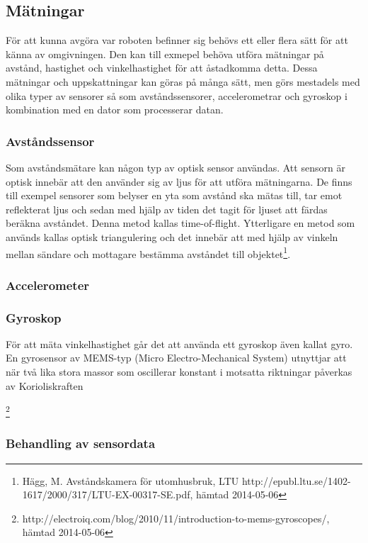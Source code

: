 \documentclass[a4paper,12pt,fleqn]{article}
\begin{document}
\subsection{Mätningar}

För att kunna avgöra var roboten befinner sig behövs ett eller flera sätt för att känna av omgivningen. Den kan till exmepel behöva utföra mätningar på avstånd, hastighet och vinkelhastighet för att åstadkomma detta. Dessa mätningar och uppskattningar kan göras på många sätt, men görs mestadels med olika typer av sensorer så som avståndssensorer, accelerometrar och gyroskop i kombination med en dator som processerar datan.

\subsubsection{Avståndssensor}

Som avståndsmätare kan någon typ av optisk sensor användas. Att sensorn är optisk innebär att den använder sig av ljus för att utföra mätningarna. De finns till exempel sensorer som belyser en yta som avstånd ska mätas till, tar emot reflekterat ljus och sedan med hjälp av tiden det tagit för ljuset att färdas beräkna avståndet. Denna metod kallas time-of-flight. Ytterligare en metod som används kallas optisk triangulering och det innebär att med hjälp av vinkeln mellan sändare och mottagare bestämma avståndet till objektet\footnote{Hägg, M. Avståndskamera för utomhusbruk, LTU http://epubl.ltu.se/1402-1617/2000/317/LTU-EX-00317-SE.pdf, hämtad 2014-05-06}.

\subsubsection{Accelerometer}

\subsubsection{Gyroskop}

För att mäta vinkelhastighet går det att använda ett gyroskop även kallat gyro. En gyrosensor av MEMS-typ (Micro Electro-Mechanical System) utnyttjar att när två lika stora massor som oscillerar konstant i motsatta riktningar påverkas av Korioliskraften

\footnote{http://electroiq.com/blog/2010/11/introduction-to-mems-gyroscopes/, hämtad 2014-05-06}


\subsubsection{Behandling av sensordata}
\end{document}

